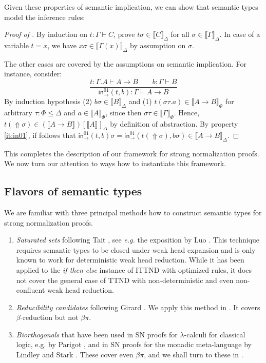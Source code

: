 \documentclass[a4paper,USenglish,cleveref, autoref, thm-restate]{lipics-v2019}
\newcommand{\eg}{\emph{e.g.}\xspace}
\newcommand{\den}[2][]{\llbracket#2\rrbracket^{#1}}
\newcommand{\ru}{\dfrac}
\newcommand{\Den}[2]{\den{#1}_{#2}}
\newcommand{\Gs}{\ensuremath{\sigma}}
\newcommand{\tin}{\ensuremath{\mathsf{in}}}
\newcommand{\inn}[2]{\ensuremath{\tin_{#1}^{#2}}}
\newcommand{\Up}{\mathop{\Uparrow}}
\begin{document}
Given these properties of semantic implication, we can show that
semantic types model the inference rules:

\begin{proof}[Proof of ]
  By induction on $t : \Gamma \vdash C$, prove $t\Gs \in \Den C \Delta$ for
  all $\Gs \in \Den \Gamma \Delta$.
  In case of a variable $t = x$, we have
  $x\Gs \in \Den{\Gamma(x)}\Delta$ by assumption on $\Gs$.

  The other cases are covered by the assumptions on semantic
  implication.  For instance, consider:
  \[
  \ru{t : \Gamma.A \vdash A \to B \qquad
      b : \Gamma \vdash B
    }{\inn\to{01}(t,b) : \Gamma \vdash A \to B
    }
  \]
  By induction hypothesis (2) $b\sigma \in \Den B \Delta$ and
  (1) $t(\sigma\tau.a) \in \Den{A \to B}\Phi$
  for arbitrary $\tau : \Phi \leq \Delta$ and $a \in \Den A \Phi$,
  since then $\sigma\tau \in \Den\Gamma\Phi$.
  Hence,
  $t(\Up\sigma) \in (\den{A \to B})[\den A]_\Delta$
  by definition of abstraction.
  By property \ref{it:in01}, if follows that
  $\inn\to{01}(t,b)\sigma = \inn\to{01}(t(\Up\sigma),b\sigma) \in \Den{A \to B}\Delta$.
\end{proof}

This completes the description of our framework for strong normalization proofs.
We now turn our attention to ways how to instantiate this framework.

\subsection{Flavors of semantic types}
\label{sec:flavors}

We are familiar with three principal methods how to construct semantic types for
strong normalization proofs.
\begin{enumerate}

\item \emph{Saturated sets} following Tait
  \cite{tait:functionalsFiniteTypeI}, see \eg the exposition by Luo
  \cite{luo:thesis}.
  This technique requires semantic types to be closed under weak head
  expansion and is only known to work for deterministic weak head
  reduction.
  While it has been applied \cite{geuversHurkens:icla17} to the
  \emph{if-then-else} instance of ITTND with optimized rules,
  it does not cover the general case of TTND with
  non-deterministic and even non-confluent weak head reduction.

\item \emph{Reducibility candidates} following Girard
  \cite{girard:thesis,girardLafontTaylor:proofsAndTypes}.  We apply
  this method in .
  It covers $\beta$-reduction but not $\beta\pi$.

\item \emph{Biorthogonals} that have been used in SN proofs for
  $\lambda$-calculi for classical logic, e.g. by Parigot \cite{parigot:jsl97},
  and in SN proofs for the monadic meta-language by Lindley and Stark
  \cite{lindleyStark:tlca05}.
  These cover even $\beta\pi$, and we shall turn to these in .
\end{enumerate}
\end{document}
